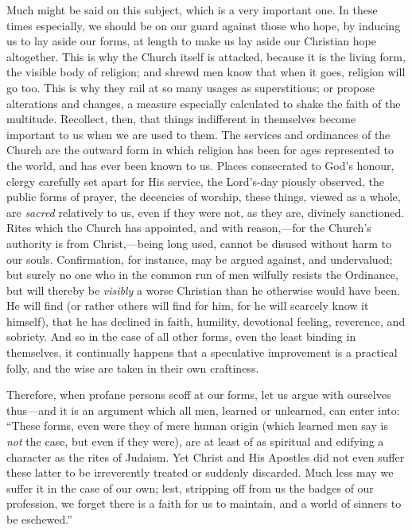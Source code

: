Much might be said on this subject, which is a very important one.
In these times especially, we should be on our guard against those who
hope, by inducing us to lay aside our forms, at length to make us lay
aside our Christian hope altogether. This is why the Church itself is
attacked, because it is the living form, the visible body of religion;
and shrewd men know that when it goes, religion will go too. This is
why they rail at so many usages as superstitious; or propose
alterations and changes, a measure especially calculated to shake the
faith of the multitude. Recollect, then, that things indifferent in
themselves become important to us when we are used to them. The
services and ordinances of the Church are the outward form in which
religion has been for ages represented to the world, and has ever been
known to us. Places consecrated to God's honour, clergy carefully set
apart for His service, the Lord's-day piously observed, the public
forms of prayer, the decencies of worship, these things, viewed as a
whole, are \emph{sacred} relatively to us, even if they were not, as
they are, divinely sanctioned. Rites which the Church has appointed,
and with reason,—for the Church's authority is from Christ,—being
long used, cannot be disused without harm to our souls. Confirmation,
for instance, may be argued against, and undervalued; but surely no
one who in the common run of men wilfully resists the Ordinance, but
will thereby be \emph{visibly} a worse Christian than he otherwise
would have been. He will find (or rather others will find for him, for
he will scarcely know it himself), that he has declined in faith,
humility, devotional feeling, reverence, and sobriety. And so in the
case of all other forms, even the least binding in themselves, it
continually happens that a speculative improvement is a practical
folly, and the wise are taken in their own craftiness.

Therefore, when profane persons scoff at our forms, let us argue
with ourselves thus—and it is an argument which all men, learned or
unlearned, can enter into: ``These forms, even were they of mere
human origin (which learned men say is \emph{not} the case, but even
if they were), are at least of as spiritual and edifying a character
as the rites of Judaism. Yet Christ and His Apostles did not even
suffer these latter to be irreverently treated or suddenly discarded.
Much less may we suffer it in the case of our own; lest, stripping off
from us the badges of our profession, we forget there is a faith for
us to maintain, and a world of sinners to be eschewed.''

